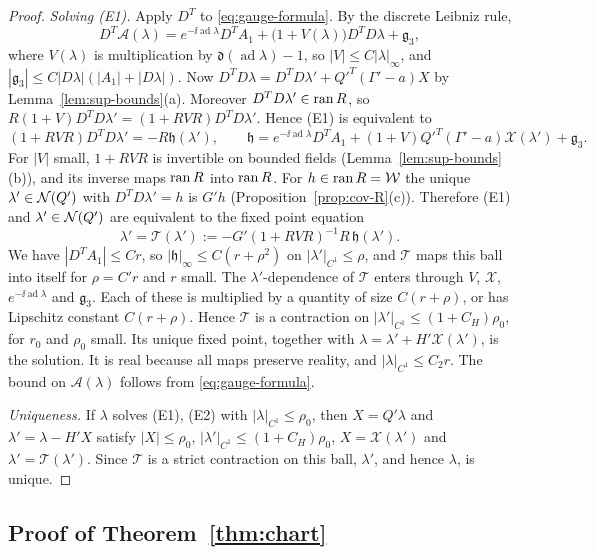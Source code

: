 \begin{proof}
\emph{Solving (E1).} Apply $D^T$ to \eqref{eq:gauge-formula}. By the discrete Leibniz rule,
\[
D^T\mathcal A(\lambda)=e^{-\ii\operatorname{ad}\lambda}D^TA_1+\big(1+V(\lambda)\big)D^TD\lambda+\mathfrak g_3,
\]
where $V(\lambda)$ is multiplication by $\mathfrak d(\operatorname{ad}\lambda)-1$, so $|V|\le C|\lambda|_\infty$, and $|\mathfrak g_3|\le C|D\lambda|(|A_1|+|D\lambda|)$. Now $D^TD\lambda=D^TD\lambda'+Q'^T(\Gamma'-a)X$ by Lemma~\ref{lem:sup-bounds}(a). Moreover $D^TD\lambda'\in\operatorname{ran} R$, so $R(1+V)D^TD\lambda'=(1+RVR)D^TD\lambda'$. Hence (E1) is equivalent to
\[
(1+RVR)D^TD\lambda'=-R\mathfrak h(\lambda'),\qquad\mathfrak h=e^{-\ii\operatorname{ad}\lambda}D^TA_1+(1+V)Q'^T(\Gamma'-a)\mathcal X(\lambda')+\mathfrak g_3 .
\]
For $|V|$ small, $1+RVR$ is invertible on bounded fields (Lemma~\ref{lem:sup-bounds}(b)), and its inverse maps $\operatorname{ran} R$ into $\operatorname{ran} R$. For $h\in\operatorname{ran} R=\mathcal W$ the unique $\lambda'\in\mathcal N(Q')$ with $D^TD\lambda'=h$ is $G'h$ (Proposition~\ref{prop:cov-R}(c)). Therefore (E1) and $\lambda'\in\mathcal N(Q')$ are equivalent to the fixed point equation
\[
\lambda'=\mathcal T(\lambda'):=-G'(1+RVR)^{-1}R\,\mathfrak h(\lambda').
\]
We have $|D^TA_1|\le Cr$, so $|\mathfrak h|_\infty\le C(r+\rho^2)$ on $|\lambda'|_{C^1}\le\rho$, and $\mathcal T$ maps this ball into itself for $\rho=C'r$ and $r$ small. The $\lambda'$-dependence of $\mathcal T$ enters through $V$, $\mathcal X$, $e^{-\ii\operatorname{ad}\lambda}$ and $\mathfrak g_3$. Each of these is multiplied by a quantity of size $C(r+\rho)$, or has Lipschitz constant $C(r+\rho)$. Hence $\mathcal T$ is a contraction on $|\lambda'|_{C^1}\le(1+C_H)\rho_0$, for $r_0$ and $\rho_0$ small. Its unique fixed point, together with $\lambda=\lambda'+H'\mathcal X(\lambda')$, is the solution. It is real because all maps preserve reality, and $|\lambda|_{C^1}\le C_2r$. The bound on $\mathcal A(\lambda)$ follows from \eqref{eq:gauge-formula}.

\emph{Uniqueness.} If $\lambda$ solves (E1), (E2) with $|\lambda|_{C^1}\le\rho_0$, then $X=Q'\lambda$ and $\lambda'=\lambda-H'X$ satisfy $|X|\le\rho_0$, $|\lambda'|_{C^1}\le(1+C_H)\rho_0$, $X=\mathcal X(\lambda')$ and $\lambda'=\mathcal T(\lambda')$. Since $\mathcal T$ is a strict contraction on this ball, $\lambda'$, and hence $\lambda$, is unique.
\end{proof}

\subsection{Proof of Theorem~\ref{thm:chart}}\label{ss:24.6}

